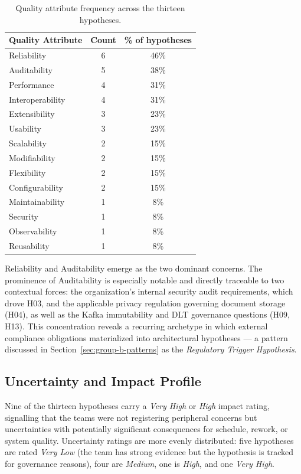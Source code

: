 \begin{table}[htbp]
\caption{Quality attribute frequency across the thirteen hypotheses.}
\label{tab:qa-distribution}
\centering\small
\begin{tabular}{lcc}
\toprule
\textbf{Quality Attribute} & \textbf{Count} & \textbf{\% of hypotheses} \\
\midrule
Reliability        & 6 & 46\% \\
Auditability       & 5 & 38\% \\
Performance        & 4 & 31\% \\
Interoperability   & 4 & 31\% \\
Extensibility      & 3 & 23\% \\
Usability          & 3 & 23\% \\
Scalability        & 2 & 15\% \\
Modifiability      & 2 & 15\% \\
Flexibility        & 2 & 15\% \\
Configurability    & 2 & 15\% \\
Maintainability    & 1 &  8\% \\
Security           & 1 &  8\% \\
Observability      & 1 &  8\% \\
Reusability        & 1 &  8\% \\
\bottomrule
\end{tabular}
\end{table}

Reliability and Auditability emerge as the two dominant concerns. The prominence
of Auditability is especially notable and directly traceable to two contextual
forces: the organization's internal security audit requirements, which drove H03,
and the applicable privacy regulation governing document storage (H04),
as well as the Kafka immutability and DLT governance questions (H09, H13).
This concentration reveals a recurring archetype in which external compliance
obligations materialized into architectural hypotheses — a pattern discussed in
Section~\ref{sec:group-b-patterns} as the \textit{Regulatory Trigger Hypothesis}.

\subsection{Uncertainty and Impact Profile}
\label{subsec:uncertainty-impact}

Nine of the thirteen hypotheses carry a \textit{Very High} or \textit{High}
impact rating, signalling that the teams were not registering peripheral concerns
but uncertainties with potentially significant consequences for schedule, rework,
or system quality. Uncertainty ratings are more evenly distributed: five
hypotheses are rated \textit{Very Low} (the team has strong evidence but the
hypothesis is tracked for governance reasons), four are \textit{Medium}, one
is \textit{High}, and one \textit{Very High}.

